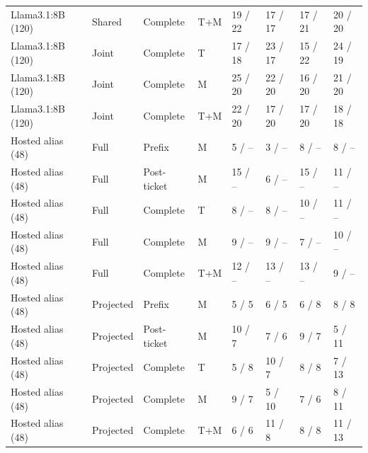 \begin{longtable}{@{}P{.14\textwidth}P{.14\textwidth}P{.08\textwidth}P{.04\textwidth}P{.125\textwidth}P{.125\textwidth}P{.125\textwidth}P{.125\textwidth}@{}}
Llama3.1:8B (120) & Shared & Complete & T+M & 19 / 22 & 17 / 17 & 17 / 21 & 20 / 20 \\
Llama3.1:8B (120) & Joint & Complete & T & 17 / 18 & 23 / 17 & 15 / 22 & 24 / 19 \\
Llama3.1:8B (120) & Joint & Complete & M & 25 / 20 & 22 / 20 & 16 / 20 & 21 / 20 \\
Llama3.1:8B (120) & Joint & Complete & T+M & 22 / 20 & 17 / 20 & 17 / 20 & 18 / 18 \\
Hosted alias (48) & Full & Prefix & M & 5 / -- & 3 / -- & 8 / -- & 8 / -- \\
Hosted alias (48) & Full & Post-ticket & M & 15 / -- & 6 / -- & 15 / -- & 11 / -- \\
Hosted alias (48) & Full & Complete & T & 8 / -- & 8 / -- & 10 / -- & 11 / -- \\
Hosted alias (48) & Full & Complete & M & 9 / -- & 9 / -- & 7 / -- & 10 / -- \\
Hosted alias (48) & Full & Complete & T+M & 12 / -- & 13 / -- & 13 / -- & 9 / -- \\
Hosted alias (48) & Projected & Prefix & M & 5 / 5 & 6 / 5 & 6 / 8 & 8 / 8 \\
Hosted alias (48) & Projected & Post-ticket & M & 10 / 7 & 7 / 6 & 9 / 7 & 5 / 11 \\
Hosted alias (48) & Projected & Complete & T & 5 / 8 & 10 / 7 & 8 / 8 & 7 / 13 \\
Hosted alias (48) & Projected & Complete & M & 9 / 7 & 5 / 10 & 7 / 6 & 8 / 11 \\
Hosted alias (48) & Projected & Complete & T+M & 6 / 6 & 11 / 8 & 8 / 8 & 11 / 13 \\
\end{longtable}
\normalsize\clearpage\twocolumn
